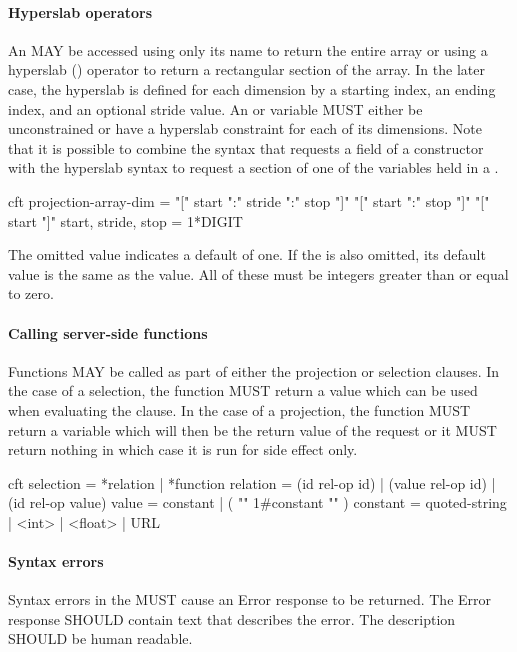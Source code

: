 \documentclass[justify]{nasa-ese}
\begin{document}
\paragraph{Hyperslab operators}
An \Array MAY be accessed using only its name to return the entire array or
using a hyperslab (\lit{[]}) operator to return a rectangular section of
the array. In the later case, the hyperslab is defined for each dimension by
a starting index, an ending index, and an optional stride value. An \Array or
\Grid variable MUST either be unconstrained or have a hyperslab constraint for
each of its dimensions. Note that it is possible to combine the syntax that
requests a field of a constructor with the \Array hyperslab syntax to request
a section of one of the \Array variables held in a \Grid.

\begin{vcode}{cft}
projection-array-dim = "[" start ":" stride ":" stop "]" 
                       "[" start ":" stop "]"
                       "[" start "]" 
start, stride, stop = 1*DIGIT 
\end{vcode}
\label{grammar-fix-08.28.07-1}

The omitted  value indicates a default of one.  If the
 is also omitted, its default value is the same as the
 value.  All of these must be integers greater than or
equal to zero.

\paragraph{Calling server-side functions}
Functions MAY be called as part of either the projection or selection
clauses. In the case of a selection, the function MUST return a value which
can be used when evaluating the clause. In the case of a projection, the
function MUST return a \DAP variable which will then be the return value of
the request or it MUST return nothing in which case it is run for side effect
only. 

\begin{vcode}{cft}
selection = *relation | *function 
relation  = (id rel-op id) | (value rel-op id) 
            | (id rel-op value) 
value     = constant | ( "{" 1#constant "}" ) 
constant  = quoted-string | <int> | <float> | URL 
\end{vcode}

\paragraph{Syntax errors}
Syntax errors in the \CE MUST cause an Error response to be returned. The
Error response SHOULD contain text that describes the error. The description
SHOULD be human readable.
\end{document}
